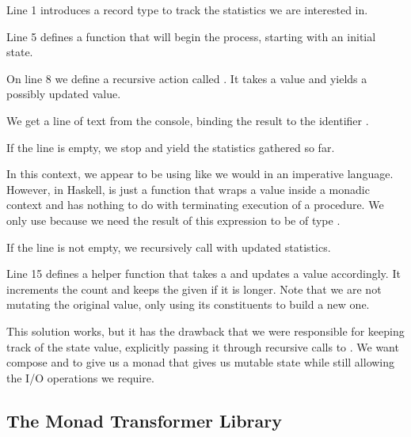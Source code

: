\begin{notelist}
    \item Line 1 introduces a record type to track the statistics we are interested in.
    \item Line 5 defines a function that will begin the process, starting with an initial state.
    \item On line 8 we define a recursive  action called . It takes a 
          value and yields a possibly updated  value.
        \begin{notelist}
            \item We get a line of text from the console, binding the result to the identifier .
            \item If the line is empty, we stop and yield the statistics gathered so far. 
            \item In this context, we appear to be using  like we would in an imperative
                  language. However, in Haskell,  is just a function that wraps a 
                  value inside a monadic context and has nothing to do with terminating execution
                  of a procedure. We only use  because we need the result of this
                  expression to be of type .
            \item If the line is not empty, we recursively call  with updated statistics.
        \end{notelist}
    \item Line 15 defines a helper function that takes a  and  updates a  value 
          accordingly. It increments the count and keeps the given  if it is longer. Note
          that we are not mutating the original  value, only using its constituents to build
          a new one.
\end{notelist}

This solution works, but it has the drawback that we were responsible for keeping track of the state value,
explicitly passing it through recursive calls to . We want compose  and 
to give us a monad that gives us mutable state while still allowing the I/O operations we require.

\subsection{The Monad Transformer Library }

